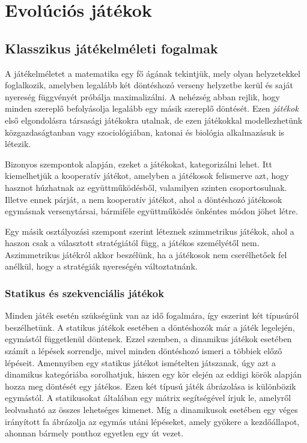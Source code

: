 \chapter{Evolúciós játékok}

\section{Klasszikus játékelméleti fogalmak}

A játékelméletet a matematika egy fő ágának tekintjük, mely olyan helyzetekkel foglalkozik, amelyben legalább két döntéshozó verseny helyzetbe kerül és saját nyereség függvényét próbálja maximalizálni. A nehézség abban rejlik, hogy minden szereplő befolyásolja legalább egy másik szereplő döntését. Ezen \textit{játékok} első elgondolásra társasági játékokra utalnak, de ezen játékokkal modellezhetünk közgazdaságtanban vagy szociológiában, katonai és biológia alkalmazásuk is létezik.

Bizonyos szempontok alapján, ezeket a játékokat, kategorizálni lehet. Itt kiemelhetjük a kooperatív játékot, amelyben a játékosok felismerve azt, hogy hasznot húzhatnak az együttműködésből, valamilyen szinten csoportosulnak. Illetve ennek párját, a nem kooperatív játékot, ahol a döntéshozó játékosok egymásnak versenytársai, bármiféle együttműködés önkéntes módon jöhet létre.

Egy másik osztályozási szempont szerint léteznek szimmetrikus játékok, ahol a haszon csak a választott stratégiától függ, a játékos személyétől nem. Aszimmetrikus játékról akkor beszélünk, ha a játékosok nem cserélhetőek fel anélkül, hogy a stratégiák nyereségén változtatnánk.

\subsection{Statikus és szekvenciális játékok}
Minden játék esetén szükségünk van az idő fogalmára, így eszerint két típusúról beszélhetünk. A statikus játékok esetében a döntéshozók már a játék legelején, egymástól függetlenül döntenek. Ezzel szemben, a dinamikus játékok esetében számít a lépések sorrendje, mivel minden döntéshozó ismeri a többiek előző lépéseit. Amennyiben egy statikus játékot ismételten játszanak, úgy azt a dinamikus kategóriába sorolhatjuk, hiszen egy kör elején az eddigi körök alapján hozza meg döntését egy játékos. Ezen két típusú játék ábrázolása is különbözik egymástól. A statikusokat általában egy mátrix segítségével írjuk le, amelyről leolvasható az összes lehetséges kimenet. Míg a dinamikusok esetében egy véges irányított fa ábrázolja az egymás utáni lépéseket, amely gyökere a kezdőállapot, ahonnan bármely ponthoz egyetlen egy út vezet.

